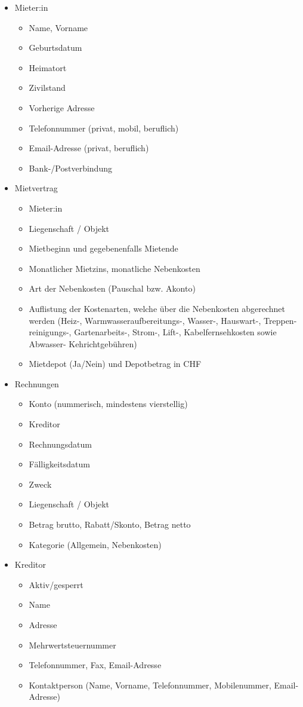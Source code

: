 \begin{itemize}
  \item Mieter:in
  \begin{itemize}
    \item Name, Vorname 
    \item Geburtsdatum
    \item Heimatort 
    \item Zivilstand
    \item Vorherige Adresse
    \item Telefonnummer (privat, mobil, beruflich)
    \item Email-Adresse (privat, beruflich)
    \item Bank-/Postverbindung
  \end{itemize}
  \item Mietvertrag
  \begin{itemize}
    \item Mieter:in
    \item Liegenschaft / Objekt
    \item Mietbeginn und gegebenenfalls Mietende
    \item Monatlicher Mietzins, monatliche Nebenkosten
    \item Art der Nebenkosten (Pauschal bzw. Akonto)
    \item Auflistung der Kostenarten, welche über die Nebenkosten abgerechnet werden (Heiz-, Warmwasseraufbereitungs-, Wasser-, Hauswart-, Treppen-reinigungs-, Gartenarbeits-, Strom-, Lift-, Kabelfernsehkosten sowie Abwasser- Kehrichtgebühren)
    \item Mietdepot (Ja/Nein) und Depotbetrag in CHF
  \end{itemize}
 
  \item Rechnungen
  \begin{itemize}
    \item Konto (nummerisch, mindestens vierstellig)
    \item Kreditor
    \item Rechnungsdatum
    \item Fälligkeitsdatum
    \item Zweck
    \item Liegenschaft / Objekt
    \item Betrag brutto, Rabatt/Skonto, Betrag netto
    \item Kategorie (Allgemein, Nebenkosten)
  \end{itemize}
  \item Kreditor
  \begin{itemize}
    \item Aktiv/gesperrt
    \item Name
    \item Adresse
    \item Mehrwertsteuernummer
    \item Telefonnummer, Fax, Email-Adresse
    \item Kontaktperson (Name, Vorname, Telefonnummer, Mobilenummer, Email-Adresse)
  \end{itemize}
\end{itemize}

